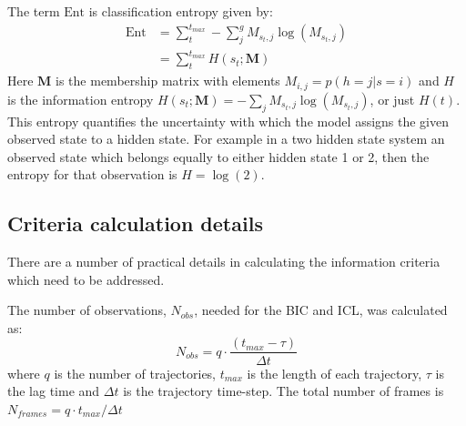 The term $\mathrm{Ent}$ is classification entropy given by: 
\begin{equation}
\begin{split}
     \mathrm{Ent} & = \sum_{t}^{t_{max}} -\sum_{j}^{g} M_{s_{t}, j}\log{\left(M_{s_{t}, j}\right)}  \\ 
     & =\sum_{t}^{t_{max}} H\left(s_{t}; \mathbf{M}\right)
\end{split}
\end{equation}
Here $\mathbf{M}$ is the membership matrix  with elements $M_{i,j}= p(h=j|s=i)$ and $H$ is the information entropy $H(s_{t};\mathbf{M}) = -\sum_j M_{s_t, j}\log{\left(M_{s_t, j}\right)}$, or just $H(t)$. This entropy quantifies the uncertainty with which the model assigns the given observed state to a hidden state. For example in a two hidden state system an observed state which belongs equally to either hidden state 1 or 2, then the entropy for that observation is $H = \log{(2)}$. 


\subsection{Criteria calculation details}\label{sec:hmm_details}
There are a number of practical details in calculating the information criteria which need to be addressed. 

The number of observations, $N_{obs}$, needed for the BIC and ICL, was calculated as: 
\begin{equation}
    N_{obs} = q\cdot\frac{(t_{max} - \tau)}{\Delta t}
\end{equation}
where $q$ is the number of trajectories, $t_{max}$ is the length of each trajectory, $\tau$ is the lag time and  $\Delta t$ is the trajectory time-step. The total number of frames is $N_{frames} = q\cdot t_{max}/\Delta t$

